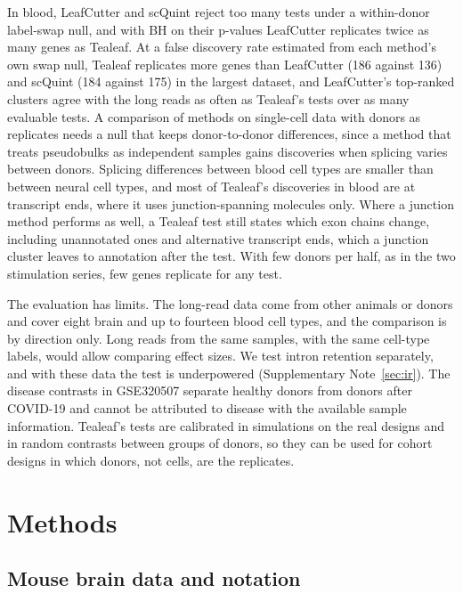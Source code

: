 \documentclass[11pt]{article}
\begin{document}
In blood, LeafCutter and scQuint reject too many tests under a within-donor label-swap null, and with BH on their p-values LeafCutter replicates twice as many genes as Tealeaf. At a false discovery rate estimated from each method's own swap null, Tealeaf replicates more genes than LeafCutter (186 against 136) and scQuint (184 against 175) in the largest dataset, and LeafCutter's top-ranked clusters agree with the long reads as often as Tealeaf's tests over as many evaluable tests. A comparison of methods on single-cell data with donors as replicates needs a null that keeps donor-to-donor differences, since a method that treats pseudobulks as independent samples gains discoveries when splicing varies between donors. Splicing differences between blood cell types are smaller than between neural cell types, and most of Tealeaf's discoveries in blood are at transcript ends, where it uses junction-spanning molecules only. Where a junction method performs as well, a Tealeaf test still states which exon chains change, including unannotated ones and alternative transcript ends, which a junction cluster leaves to annotation after the test. With few donors per half, as in the two stimulation series, few genes replicate for any test.

The evaluation has limits. The long-read data come from other animals or donors and cover eight brain and up to fourteen blood cell types, and the comparison is by direction only. Long reads from the same samples, with the same cell-type labels, would allow comparing effect sizes. We test intron retention separately, and with these data the test is underpowered (Supplementary Note~\ref{sec:ir}). The disease contrasts in GSE320507 separate healthy donors from donors after COVID-19 and cannot be attributed to disease with the available sample information. Tealeaf's tests are calibrated in simulations on the real designs and in random contrasts between groups of donors, so they can be used for cohort designs in which donors, not cells, are the replicates.

\section{Methods}

\subsection{Mouse brain data and notation}
\end{document}
